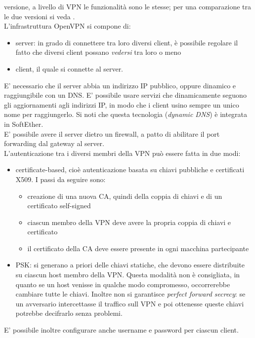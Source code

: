 versione, a livello di VPN le funzionalità sono le stesse; per una comparazione tra
le due versioni si veda
\cite{openvpn-comparison}.\\
L'infrastruttura OpenVPN si compone di:
\begin{itemize}
  \item server: in grado di connettere tra loro diversi client, è possibile regolare
  il fatto che diversi client possano \textit{vedersi} tra loro o meno
  \item client, il quale si connette al server.
\end{itemize}
E' necessario che il server abbia un indirizzo IP pubblico, oppure dinamico e raggiungibile con un DNS. E' possibile
usare servizi che dinamicamente seguono gli aggiornamenti agli indirizzi IP, in modo che i client usino
sempre un unico nome per raggiungerlo. Si noti che questa tecnologia (\textit{dynamic DNS}) è integrata in SoftEther.\\
E' possibile avere il server dietro un firewall, a patto di abilitare il port forwarding dal gateway al server.\\
L'autenticazione tra i diversi membri della VPN può essere fatta in due modi:
\begin{itemize}
  \item certificate-based, cioè autenticazione basata su chiavi pubbliche e certificati
  X509. I passi da seguire sono:
  \begin{itemize}
    \item creazione di una nuova CA, quindi della coppia di chiavi e di un certificato
    self-signed
    \item ciascun membro della VPN deve avere la propria coppia di chiavi e certificato
    \item il certificato della CA deve essere presente in ogni macchina partecipante
  \end{itemize}
  \item PSK: si generano a priori delle chiavi statiche, che devono essere distribuite
  su ciascun host membro della VPN. Questa modalità non è consigliata, in quanto
  se un host venisse in qualche modo compromesso, occorrerebbe cambiare tutte le chiavi.
  Inoltre non si garantisce \textit{perfect forward secrecy}: se un avversario
  intercettasse il traffico sull VPN e poi ottenesse queste chiavi potrebbe
  decifrarlo senza problemi.
\end{itemize}
E' possibile inoltre configurare anche username e password per ciascun client.

